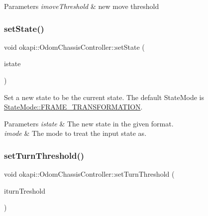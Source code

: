 \begin{DoxyParams}{Parameters}
{\em imove\+Threshold} & new move threshold \\
\hline
\end{DoxyParams}
\mbox{\label{classokapi_1_1OdomChassisController_a1e3a4b62e89ab0869c4046983ab7d11b}} 
\subsubsection{\texorpdfstring{setState()}{setState()}}
{\footnotesize\ttfamily void okapi\+::\+Odom\+Chassis\+Controller\+::set\+State (\begin{DoxyParamCaption}\item[{const \mbox{\hyperlink{structokapi_1_1OdomState}{Odom\+State}} \&}]{istate }\end{DoxyParamCaption})\hspace{0.3cm}{\ttfamily [virtual]}}

Set a new state to be the current state. The default State\+Mode is {\ttfamily \mbox{\hyperlink{namespaceokapi_af37fbd761bd859a00ff4dd4a87dd8c07ad5ed7666e5cebf60d3af20a5a46edf3b}{State\+Mode\+::\+F\+R\+A\+M\+E\+\_\+\+T\+R\+A\+N\+S\+F\+O\+R\+M\+A\+T\+I\+ON}}}.


\begin{DoxyParams}{Parameters}
{\em istate} & The new state in the given format. \\
\hline
{\em imode} & The mode to treat the input state as. \\
\hline
\end{DoxyParams}
\mbox{\label{classokapi_1_1OdomChassisController_a771daa37b47909a523571e9173f676d5}} 
\subsubsection{\texorpdfstring{setTurnThreshold()}{setTurnThreshold()}}
{\footnotesize\ttfamily void okapi\+::\+Odom\+Chassis\+Controller\+::set\+Turn\+Threshold (\begin{DoxyParamCaption}\item[{const Q\+Angle \&}]{iturn\+Treshold }\end{DoxyParamCaption})\hspace{0.3cm}{\ttfamily [virtual]}}

